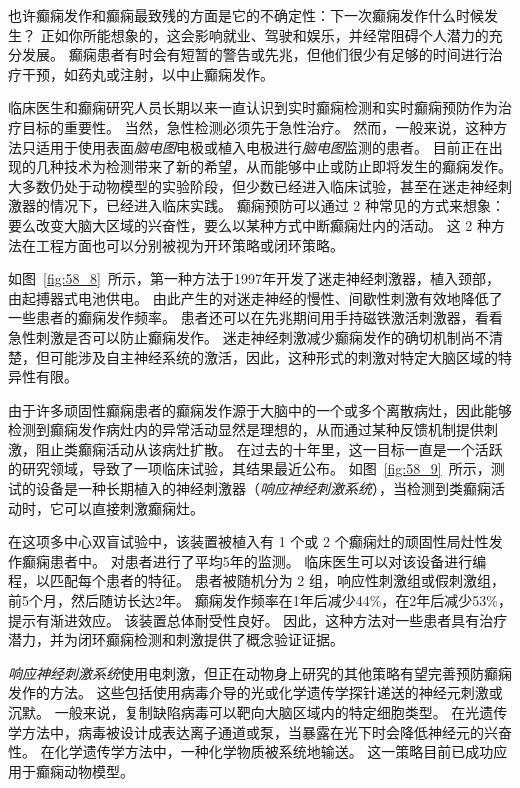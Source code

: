 \begin{proposition}[实时检测和预防癫痫的新方法] \label{box:58_2}
	
	\quad \quad 也许癫痫发作和癫痫最致残的方面是它的不确定性：下一次癫痫发作什么时候发生？
	正如你所能想象的，这会影响就业、驾驶和娱乐，并经常阻碍个人潜力的充分发展。
	癫痫患者有时会有短暂的警告或先兆，但他们很少有足够的时间进行治疗干预，如药丸或注射，以中止癫痫发作。
	
	\quad \quad 临床医生和癫痫研究人员长期以来一直认识到实时癫痫检测和实时癫痫预防作为治疗目标的重要性。
	当然，急性检测必须先于急性治疗。
	然而，一般来说，这种方法只适用于使用表面\textit{脑电图}电极或植入电极进行\textit{脑电图}监测的患者。
	目前正在出现的几种技术为检测带来了新的希望，从而能够中止或防止即将发生的癫痫发作。
	大多数仍处于动物模型的实验阶段，但少数已经进入临床试验，甚至在迷走神经刺激器的情况下，已经进入临床实践。
	癫痫预防可以通过 2 种常见的方式来想象：要么改变大脑大区域的兴奋性，要么以某种方式中断癫痫灶内的活动。
	这 2 种方法在工程方面也可以分别被视为开环策略或闭环策略。
	
	\quad \quad 如图~\ref{fig:58_8}~所示，第一种方法于1997年开发了迷走神经刺激器，植入颈部，由起搏器式电池供电。
	由此产生的对迷走神经的慢性、间歇性刺激有效地降低了一些患者的癫痫发作频率。
	患者还可以在先兆期间用手持磁铁激活刺激器，看看急性刺激是否可以防止癫痫发作。
	迷走神经刺激减少癫痫发作的确切机制尚不清楚，但可能涉及自主神经系统的激活，因此，这种形式的刺激对特定大脑区域的特异性有限。
	
	\quad \quad 由于许多顽固性癫痫患者的癫痫发作源于大脑中的一个或多个离散病灶，因此能够检测到癫痫发作病灶内的异常活动显然是理想的，从而通过某种反馈机制提供刺激，阻止类癫痫活动从该病灶扩散。
	在过去的十年里，这一目标一直是一个活跃的研究领域，导致了一项临床试验，其结果最近公布。
	如图~\ref{fig:58_9}~所示，测试的设备是一种长期植入的神经刺激器（\textit{响应神经刺激系统}），当检测到类癫痫活动时，它可以直接刺激癫痫灶。
	
	\quad \quad 在这项多中心双盲试验中，该装置被植入有 1 个或 2 个癫痫灶的顽固性局灶性发作癫痫患者中。
	对患者进行了平均5年的监测。
	临床医生可以对该设备进行编程，以匹配每个患者的特征。
	患者被随机分为 2 组，响应性刺激组或假刺激组，前5个月，然后随访长达2年。
	癫痫发作频率在1年后减少44\%，在2年后减少53\%，提示有渐进效应。
	该装置总体耐受性良好。
	因此，这种方法对一些患者具有治疗潜力，并为闭环癫痫检测和刺激提供了概念验证证据。
	
	\quad \quad \textit{响应神经刺激系统}使用电刺激，但正在动物身上研究的其他策略有望完善预防癫痫发作的方法。
	这些包括使用病毒介导的光或化学遗传学探针递送的神经元刺激或沉默。
	一般来说，复制缺陷病毒可以靶向大脑区域内的特定细胞类型。
	在光遗传学方法中，病毒被设计成表达离子通道或泵，当暴露在光下时会降低神经元的兴奋性。
	在化学遗传学方法中，一种化学物质被系统地输送。
	这一策略目前已成功应用于癫痫动物模型。
	

\end{proposition}
